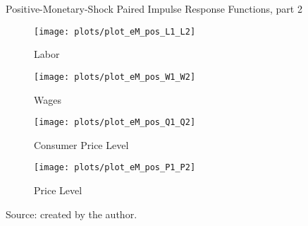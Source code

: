 \documentclass[../thesis.tex]{subfiles}
\begin{document}
\begin{figure}[h!]
	\centering
	\caption{Positive-Monetary-Shock Paired Impulse Response Functions, part 2}
	\begin{subfigure}[b]{0.48\textwidth}
		\centering
		\texttt{[image: plots/plot\_eM\_pos\_L1\_L2]}
		\caption{\scriptsize Labor}
		\label{fig:plot_eM_pos_L1_L2}
	\end{subfigure}
	\hspace*{0.3cm}
	\begin{subfigure}[b]{0.48\textwidth}
		\centering
		\texttt{[image: plots/plot\_eM\_pos\_W1\_W2]}
		\caption{\scriptsize Wages}
		\label{fig:plot_eM_pos_W1_W2}
	\end{subfigure}
	\vspace*{0.1cm}
	\begin{subfigure}[b]{0.48\textwidth}
		\centering
		\texttt{[image: plots/plot\_eM\_pos\_Q1\_Q2]}
		\caption{\scriptsize Consumer Price Level}
		\label{fig:plot_eM_pos_Q1_Q2}
	\end{subfigure}
	\hspace*{0.3cm}
	\begin{subfigure}[b]{0.48\textwidth}
		\centering
		\texttt{[image: plots/plot\_eM\_pos\_P1\_P2]}
		\caption{\scriptsize Price Level}
		\label{fig:plot_eM_pos_P1_P2}
	\end{subfigure}
	\caption*{Source: created by the author.}
	\label{fig:paired_pos_irf2}
\end{figure}
\end{document}
